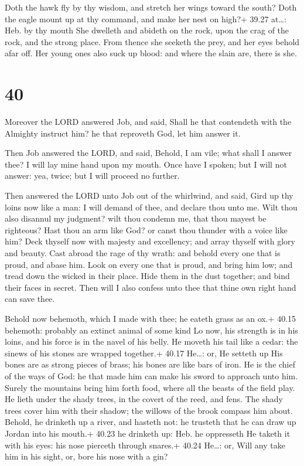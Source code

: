  Doth the hawk fly by thy wisdom, and stretch her wings
toward the south?  Doth the eagle mount up at thy command,
and make her nest on high?+ 39.27 at\ldots: Heb. by thy mouth
 She dwelleth and abideth on the rock, upon the crag of the
rock, and the strong place.  From thence she seeketh the
prey, and her eyes behold afar off.  Her young ones also
suck up blood: and where the slain are, there is she.

\hypertarget{section-39}{%
\section{40}\label{section-39}}

 Moreover the LORD answered Job, and said, 
Shall he that contendeth with the Almighty instruct him? he that
reproveth God, let him answer it.

 Then Job answered the LORD, and said, 
Behold, I am vile; what shall I answer thee? I will lay mine hand upon
my mouth.  Once have I spoken; but I will not answer: yea,
twice; but I will proceed no further.

 Then answered the LORD unto Job out of the whirlwind, and
said,  Gird up thy loins now like a man: I will demand of
thee, and declare thou unto me.  Wilt thou also disannul my
judgment? wilt thou condemn me, that thou mayest be righteous?
 Hast thou an arm like God? or canst thou thunder with a
voice like him?  Deck thyself now with majesty and
excellency; and array thyself with glory and beauty.  Cast
abroad the rage of thy wrath: and behold every one that is proud, and
abase him.  Look on every one that is proud, and bring him
low; and tread down the wicked in their place.  Hide them
in the dust together; and bind their faces in secret.  Then
will I also confess unto thee that thine own right hand can save thee.

 Behold now behemoth, which I made with thee; he eateth
grass as an ox.+ 40.15 behemoth: probably an extinct animal of some kind
 Lo now, his strength is in his loins, and his force is in
the navel of his belly.  He moveth his tail like a cedar:
the sinews of his stones are wrapped together.+ 40.17 He\ldots: or, He
setteth up  His bones are as strong pieces of brass; his
bones are like bars of iron.  He is the chief of the ways
of God: he that made him can make his sword to approach unto him.
 Surely the mountains bring him forth food, where all the
beasts of the field play.  He lieth under the shady trees,
in the covert of the reed, and fens.  The shady trees cover
him with their shadow; the willows of the brook compass him about.
 Behold, he drinketh up a river, and hasteth not: he
trusteth that he can draw up Jordan into his mouth.+ 40.23 he drinketh
up: Heb. he oppresseth  He taketh it with his eyes: his
nose pierceth through snares.+ 40.24 He\ldots: or, Will any take him in
his sight, or, bore his nose with a gin?

